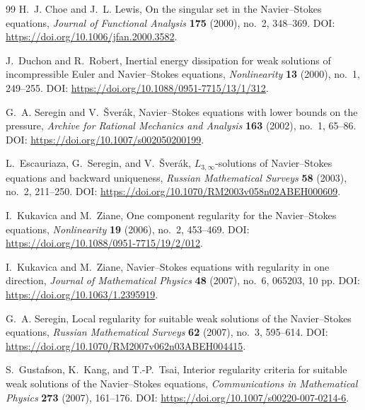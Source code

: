 \documentclass[11pt]{article}
\numberwithin{equation}{section}
\theoremstyle{plain}
\theoremstyle{definition}
\theoremstyle{remark}
\begin{document}
\begin{thebibliography}{99}
H.~J. Choe and J.~L. Lewis,
\newblock On the singular set in the Navier--Stokes equations,
\newblock \emph{Journal of Functional Analysis} \textbf{175} (2000), no.~2, 348--369.
\newblock DOI: \url{https://doi.org/10.1006/jfan.2000.3582}.

J.~Duchon and R.~Robert,
\newblock Inertial energy dissipation for weak solutions of incompressible Euler and Navier--Stokes equations,
\newblock \emph{Nonlinearity} \textbf{13} (2000), no.~1, 249--255.
\newblock DOI: \url{https://doi.org/10.1088/0951-7715/13/1/312}.

G.~A. Seregin and V.~\v{S}ver\'ak,
\newblock Navier--Stokes equations with lower bounds on the pressure,
\newblock \emph{Archive for Rational Mechanics and Analysis} \textbf{163} (2002), no.~1, 65--86.
\newblock DOI: \url{https://doi.org/10.1007/s002050200199}.

L.~Escauriaza, G.~Seregin, and V.~\v{S}ver\'ak,
\newblock \(L_{3,\infty}\)-solutions of Navier--Stokes equations and backward uniqueness,
\newblock \emph{Russian Mathematical Surveys} \textbf{58} (2003), no.~2, 211--250.
\newblock DOI: \url{https://doi.org/10.1070/RM2003v058n02ABEH000609}.

I.~Kukavica and M.~Ziane,
\newblock One component regularity for the Navier--Stokes equations,
\newblock \emph{Nonlinearity} \textbf{19} (2006), no.~2, 453--469.
\newblock DOI: \url{https://doi.org/10.1088/0951-7715/19/2/012}.

I.~Kukavica and M.~Ziane,
\newblock Navier--Stokes equations with regularity in one direction,
\newblock \emph{Journal of Mathematical Physics} \textbf{48} (2007), no.~6, 065203, 10 pp.
\newblock DOI: \url{https://doi.org/10.1063/1.2395919}.

G.~A. Seregin,
\newblock Local regularity for suitable weak solutions of the Navier--Stokes equations,
\newblock \emph{Russian Mathematical Surveys} \textbf{62} (2007), no.~3, 595--614.
\newblock DOI: \url{https://doi.org/10.1070/RM2007v062n03ABEH004415}.

S.~Gustafson, K.~Kang, and T.-P.~Tsai,
\newblock Interior regularity criteria for suitable weak solutions of the Navier--Stokes equations,
\newblock \emph{Communications in Mathematical Physics} \textbf{273} (2007), 161--176.
\newblock DOI: \url{https://doi.org/10.1007/s00220-007-0214-6}.


\end{thebibliography}
\end{document}
